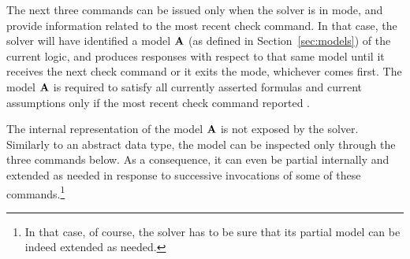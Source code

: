 The next three commands can be issued only when the solver is 
in  mode, and provide information related 
to the most recent check command.
In that case, the solver will have identified a model $\mathbf{A}$ 
(as defined in Section~\ref{sec:models}) of the current logic,
and produces responses with respect to that same model until 
it receives the next check command or it exits the  mode,
whichever comes first.
The model $\mathbf{A}$ is required to satisfy all currently asserted formulas 
and current assumptions only if the most recent check command
reported .

The internal representation of the model $\mathbf{A}$ is not exposed by the solver.
Similarly to an abstract data type, the model can be inspected only 
through the three commands below.
As a consequence, it can even be partial internally and extended as needed 
in response to successive invocations of some of these commands.\footnote{%
In that case, of course, the solver has to be sure 
that its partial model can be indeed extended as needed.
}

